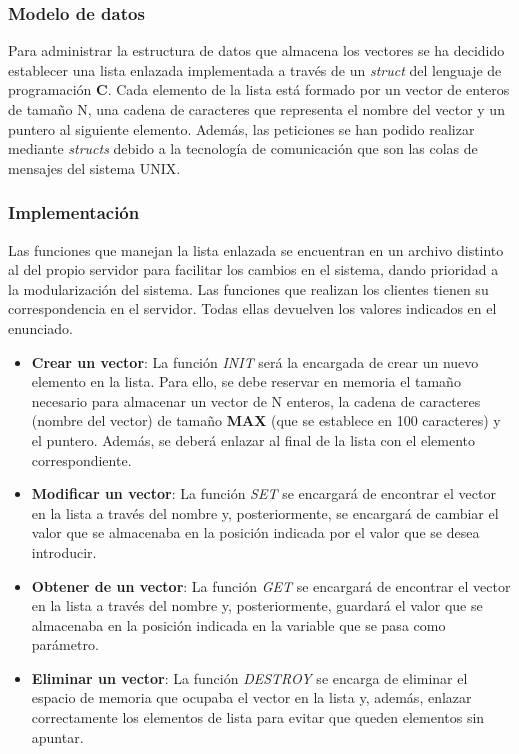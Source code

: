 \documentclass[10pt, spanish, pdftex]{template/UC3M_document}
\begin{document}
\subsubsection{Modelo de datos}
Para administrar la estructura de datos que almacena los vectores se ha decidido establecer una lista enlazada implementada a través de un \textit{struct} del lenguaje de programación \textbf{C}. Cada elemento de la lista está formado por un vector de enteros de tamaño N, una cadena de caracteres que representa el nombre del vector y un puntero al siguiente elemento.
Además, las peticiones se han podido realizar mediante \textit{structs} debido a la tecnología de comunicación que son las colas de mensajes del sistema UNIX.

\subsubsection{Implementación}
Las funciones que manejan la lista enlazada se encuentran en un archivo distinto al del propio servidor para facilitar los cambios en el sistema, dando prioridad a la modularización del sistema. Las funciones que realizan los clientes tienen su correspondencia en el servidor. Todas ellas devuelven los valores indicados en el enunciado.
\begin{itemize}
    \item \textbf{Crear un vector}: La función \textit{INIT} será la encargada de crear un nuevo elemento en la lista. Para ello, se debe reservar en memoria el tamaño necesario para almacenar un vector de N enteros, la cadena de caracteres (nombre del vector) de tamaño \textbf{MAX} (que se establece en 100 caracteres) y el puntero. Además, se deberá enlazar al final de la lista con el elemento correspondiente.
    \item \textbf{Modificar un vector}: La función \textit{SET} se encargará de encontrar el vector en la lista a través del nombre y, posteriormente, se encargará de cambiar el valor que se almacenaba en la posición indicada por el valor que se desea introducir.
    \item \textbf{Obtener de un vector}: La función \textit{GET} se encargará de encontrar el vector en la lista a través del nombre y, posteriormente, guardará el valor que se almacenaba en la posición indicada en la variable que se pasa como parámetro.
    \item \textbf{Eliminar un vector}: La función \textit{DESTROY} se encarga de eliminar el espacio de memoria que ocupaba el vector en la lista y, además, enlazar correctamente los elementos de lista para evitar que queden elementos sin apuntar.
\end{itemize}
\end{document}
